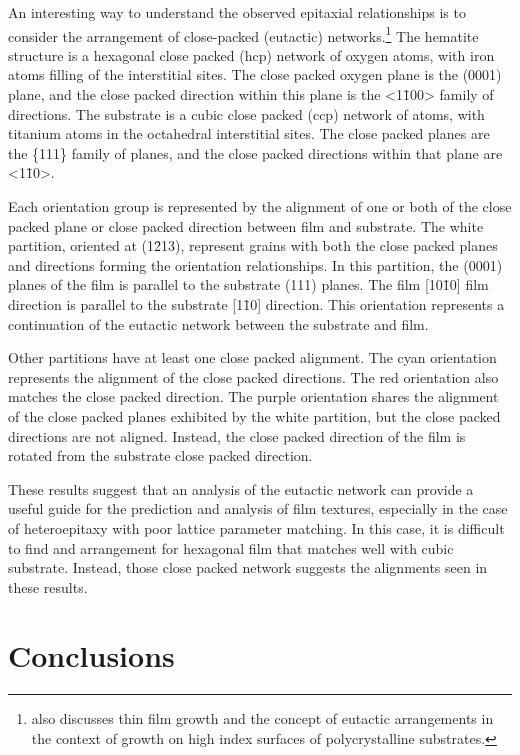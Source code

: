 An interesting way to understand the observed epitaxial relationships is to consider the arrangement of close-packed (eutactic)\cite{OKeeffe:1977vx} networks.\footnote{ also discusses  thin film growth and the concept of eutactic arrangements in the context of growth on high index surfaces of polycrystalline substrates.} The hematite structure is a hexagonal close packed (hcp) network of oxygen atoms, with iron atoms filling  of the interstitial sites. The close packed oxygen plane is the (0001) plane, and the close packed direction within this plane is the <1\={1}00> family of directions. The  substrate is a cubic close packed (ccp) network of  atoms, with titanium atoms in  the octahedral interstitial sites. The close packed planes are the \{111\} family of planes, and the close packed directions within that plane are <1\={1}0>. 

Each orientation group is represented by the alignment of one or both of the close packed plane or close packed direction between film and substrate. The white partition, oriented at (1\={2}13), represent grains with both the close packed planes and directions forming the orientation relationships. In this partition, the  (0001) planes of the film is parallel to the substrate (111) planes. The film [10\={1}0] film direction is parallel to the substrate [1\={1}0] direction. This orientation represents a continuation of the eutactic network between the substrate and film.

Other partitions have at least one close packed alignment. The cyan orientation represents the alignment of the close packed directions. The red orientation also matches the close packed direction. The purple orientation shares the alignment of the close packed planes exhibited by the white partition, but the close packed directions are not aligned. Instead, the close packed direction of the film is rotated \degree{} from the substrate close packed direction.

These results suggest that an analysis of the eutactic network can provide a useful guide for the prediction and analysis of film textures, especially in the case of heteroepitaxy with poor lattice parameter matching. In this case, it is difficult to find and arrangement for hexagonal film that matches well with cubic substrate. Instead, those close packed network suggests the alignments seen in these results.


\section{Conclusions}
\label{sec:single.growth.conclusions}


